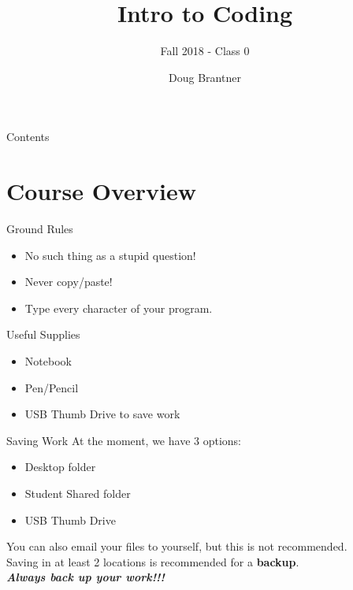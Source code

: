 \documentclass[pdf]{beamer}
\title{Intro to Coding}
\subtitle{Fall 2018 - Class 0}
\author{Doug Brantner}
\begin{document}

\begin{frame}
\titlepage
\end{frame}

\begin{frame}{Contents}
\tableofcontents
\end{frame}


\section{Course Overview}


\begin{frame}{Ground Rules}
\begin{itemize}
\item No such thing as a stupid question!
\item Never copy/paste!
\item Type every character of your program.
\end{itemize}
\end{frame}


\begin{frame}{Useful Supplies}
\begin{itemize}
\item Notebook
\item Pen/Pencil
\item USB Thumb Drive to save work
\end{itemize}
\end{frame}

\begin{frame}{Saving Work}
At the moment, we have 3 options:
\begin{itemize}
\item Desktop folder
\item Student Shared folder
\item USB Thumb Drive
\end{itemize}
You can also email your files to yourself, but this is not recommended.\\
Saving in at least 2 locations is recommended for a \textbf{backup}.\\
\textbf{\textit{Always back up your work!!!}}
\end{frame}
\end{document}
